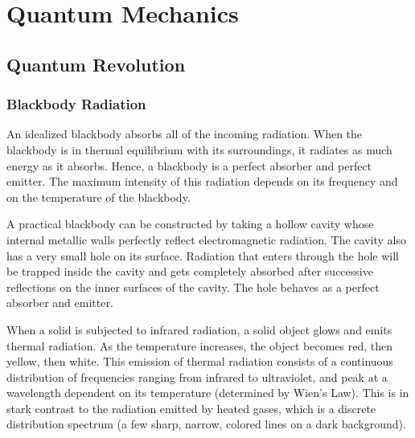 \documentclass[a4paper]{article}
\begin{document}
\section{Quantum Mechanics}
\cite{zettili2009quantum}
\subsection{Quantum Revolution}
\subsubsection*{Blackbody Radiation}
\begin{defi}[Blackbody]
An idealized blackbody absorbs all of the incoming radiation. When the blackbody is in thermal equilibrium with its surroundings, it radiates as much energy as it absorbs. Hence, a blackbody is a perfect absorber and perfect emitter. The maximum intensity of this radiation depends on its frequency and on the temperature of the blackbody.
\end{defi}
\begin{Note}
A practical blackbody can be constructed by taking a hollow cavity whose internal metallic walls perfectly reflect electromagnetic radiation. The cavity also has a very small hole on its surface. Radiation that enters through the hole will be trapped inside the cavity and gets completely absorbed after successive reflections on the inner surfaces of the cavity. The hole behaves as a perfect absorber and emitter.
\end{Note}
\begin{Note}
When a solid is subjected to infrared radiation, a solid object glows and emits thermal radiation. As the temperature increases, the object becomes red, then yellow, then white. This emission of thermal radiation consists of a continuous distribution of frequencies ranging from infrared to ultraviolet, and peak at a wavelength dependent on its temperature (determined by Wien's Law). This is in stark contrast to the radiation emitted by heated gases, which is a discrete distribution spectrum (a few sharp, narrow, colored lines on a dark background).
\end{Note}
\end{document}
